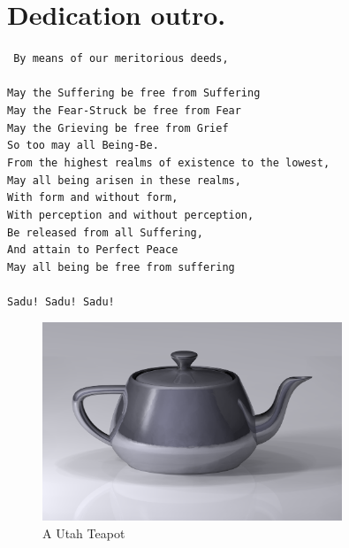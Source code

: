 \documentclass[12pt]{book}
\begin{document}


\appendix

\clearpage
\section{Dedication outro.}
\label{outchant}
\thispagestyle{plain}

\texttt{
By means of our meritorious deeds,\\
\\
May the Suffering be free from Suffering\\
May the Fear-Struck be free from Fear\\
May the Grieving be free from Grief\\
So too may all Being-Be.\\
From the highest realms of existence to the lowest,\\
May all being arisen in these realms,\\
With form and without form,\\
With perception and without perception,\\
Be released from all Suffering,\\
And attain to Perfect Peace\\
May all being be free from suffering\\
\\
Sadu! Sadu! Sadu!
}

\begin{figure}
    \centering
    \includegraphics[width=0.8\textwidth]{figures/utah.png}
    \caption{A Utah Teapot \cite{teapot}}
\end{figure}
\end{document}
